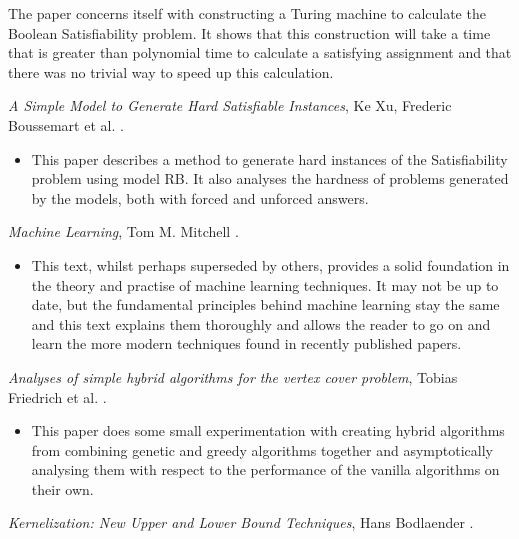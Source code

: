 \documentclass[11pt]{article}
\theoremstyle{definition}
\begin{document}
\begin{basedescript}{\desclabelstyle{\nextlinelabel}}
\begin{itemize}
\indent The paper concerns itself with constructing a Turing machine to calculate the Boolean Satisfiability problem. It shows that this construction will take a time that is greater than polynomial time to calculate a satisfying assignment and that there was no trivial way to speed up this calculation.
        \end{itemize}
        \item \textit{A Simple Model to Generate Hard Satisfiable Instances}, Ke Xu, Frederic Boussemart et al. \cite{citeulike:XuSimple}.
        \begin{itemize}
           \renewcommand{\labelitemi}{--} 
          \item This paper describes a method to generate hard instances of the Satisfiability problem using model RB. It also analyses the hardness of problems generated by the models, both with forced and unforced answers. 
        \end{itemize}
        \newpage
        \item \textit{Machine Learning}, Tom M. Mitchell \cite{Mitchell.97}.
        \begin{itemize} 
           \renewcommand{\labelitemi}{--}
          \setlength{\itemsep}{1pt}
          \setlength{\parskip}{0pt}
          \setlength{\parsep}{0pt}
          \item This text, whilst perhaps superseded by others, provides a solid foundation in the theory and practise of machine learning techniques. It may not be up to date, but the fundamental principles behind machine learning stay the same and this text explains them thoroughly and allows the reader to go on and learn the more modern techniques found in recently published papers. 
        \end{itemize}
        \item \textit{Analyses of simple hybrid algorithms for the vertex cover problem}, Tobias Friedrich et al. \cite{paper:hybrid}.
        \begin{itemize}
           \renewcommand{\labelitemi}{--} 
          \setlength{\itemsep}{1pt}
          \setlength{\parskip}{0pt}
          \setlength{\parsep}{0pt}
          \item This paper does some small experimentation with creating hybrid algorithms from combining genetic and greedy algorithms together and asymptotically analysing them with respect to the performance of the vanilla algorithms on their own.
        \end{itemize}
        \item \textit{Kernelization: New Upper and Lower Bound Techniques}, Hans Bodlaender  \cite{paper:KernelIntro}.

\end{basedescript}
\end{document}
